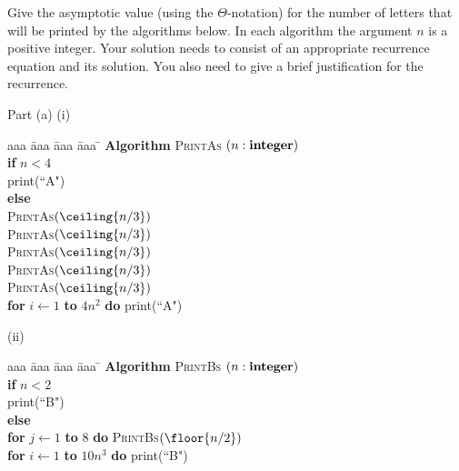 \documentclass{article}
\begin{document}
\begin{problem}
Give the asymptotic value (using the $\Theta$-notation)
for the number of letters that will be printed by the algorithms below.
In each algorithm the argument $n$ is a positive integer.
Your solution needs to consist of an appropriate recurrence 
equation and its solution. You also need to give a brief justification for
the recurrence. 

\bigskip
\noindent
Part (a) 
\vskip 0.2in
\noindent(i)\ \ 
\begin{minipage}[t]{3in}
\begin{tabbing}
aaa \= aaa \= aaa \= aaa \=  \kill
\textbf{Algorithm} \textsc{PrintAs} $(n: \mbox{\bf integer})$ \\
          \> \textbf{if} $n < 4$ \\
          \>\>  print(``A") \\
          \>\textbf{else} \\
          \>\>  \textsc{PrintAs}$(\ceiling{n/3})$\\
          \>\>  \textsc{PrintAs}$(\ceiling{n/3})$\\
          \>\>  \textsc{PrintAs}$(\ceiling{n/3})$\\
          \>\>  \textsc{PrintAs}$(\ceiling{n/3})$\\
           \>\>  \textsc{PrintAs}$(\ceiling{n/3})$\\
      \>\> \textbf{for} $i \leftarrow 1$ \textbf{to} $4n^2$ \textbf{do} print(``A")
\end{tabbing}
\end{minipage}

\vskip 0.2in
\noindent
(ii)\ \
\begin{minipage}[t]{3in}
\begin{tabbing}
aaa \= aaa \= aaa \= aaa \=  \kill
\textbf{Algorithm} \textsc{PrintBs} $(n: \mbox{\bf integer})$ \\
          \> \textbf{if} $n < 2$ \\
          \>\>  print(``B") \\
          \>\textbf{else} \\
          \>\>  \textbf{for} $j \leftarrow 1$ \textbf{to} $8$ 
					\textbf{do} \textsc{PrintBs}$(\floor{n/2})$\\
      \>\> \textbf{for} $i \leftarrow 1$ \textbf{to} $10n^3$ \textbf{do} print(``B")
\end{tabbing}
\end{minipage}


\end{problem}
\end{document}
